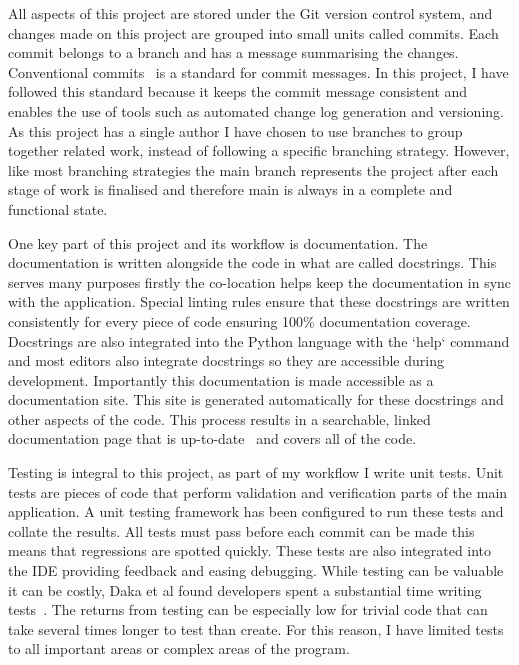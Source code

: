 \documentclass[]{final_report}
\begin{document}
All aspects of this project are stored under the Git version control system, and changes made on this project are grouped into small units called commits. Each commit belongs to a branch and has a message summarising the changes. Conventional commits~\cite{conventionalCommitsOnline} is a standard for commit messages. In this project, I have followed this standard because it keeps the commit message consistent and enables the use of tools such as automated change log generation and versioning. As this project has a single author I have chosen to use branches to group together related work, instead of following a specific branching strategy. However, like most branching strategies the main branch represents the project after each stage of work is finalised and therefore main is always in a complete and functional state. 

One key part of this project and its workflow is documentation. The documentation is written alongside the code in what are called docstrings. This serves many purposes firstly the co-location helps keep the documentation in sync with the application. Special linting rules ensure that these docstrings are written consistently for every piece of code ensuring 100\% documentation coverage. Docstrings are also integrated into the Python language with the `help` command and most editors also integrate docstrings so they are accessible during development. Importantly this documentation is made accessible as a documentation site. This site is generated automatically for these docstrings and other aspects of the code. This process results in a searchable, linked documentation page that is up-to-date~\cite{pythonAutoDoc} and covers all of the code. 

Testing is integral to this project, as part of my workflow I write unit tests. Unit tests are pieces of code that perform validation and verification parts of the main application. A unit testing framework has been configured to run these tests and collate the results. All tests must pass before each commit can be made this means that regressions are spotted quickly. These tests are also integrated into the IDE providing feedback and easing debugging.  While testing can be valuable it can be costly, Daka et al found developers spent a substantial time writing tests~\cite{unitTestingSurvey}. The returns from testing can be especially low for trivial code that can take several times longer to test than create. For this reason, I have limited tests to all important areas or complex areas of the program.  
\end{document}
